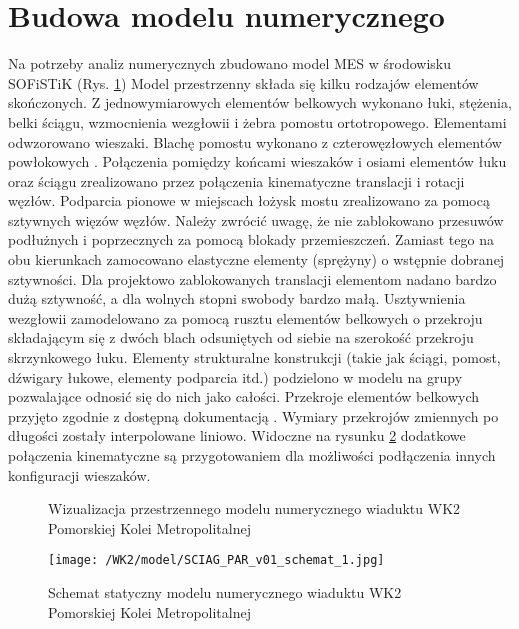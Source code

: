 \section{Budowa modelu numerycznego} \label{sect:wk2_basic_num_model}

Na potrzeby analiz numerycznych zbudowano model MES w środowisku SOFiSTiK (Rys. \ref{fig: model_wk2_visualization}) Model przestrzenny składa się kilku rodzajów elementów skończonych. Z jednowymiarowych elementów belkowych wykonano łuki, stężenia, belki ściągu, wzmocnienia wezgłowii i żebra pomostu ortotropowego. Elementami  odwzorowano wieszaki. Blachę pomostu wykonano z czterowęzłowych elementów powłokowych \parencite{SOFiSTiK2018}. Połączenia pomiędzy końcami wieszaków i osiami elementów łuku oraz ściągu zrealizowano przez połączenia kinematyczne translacji i rotacji węzłów. Podparcia pionowe w miejscach łożysk mostu zrealizowano za pomocą sztywnych więzów węzłów. Należy zwrócić uwagę, że nie zablokowano przesuwów podłużnych i poprzecznych za pomocą blokady przemieszczeń. Zamiast tego na obu kierunkach zamocowano elastyczne elementy (sprężyny) o wstępnie dobranej sztywności. Dla projektowo zablokowanych translacji elementom nadano bardzo dużą sztywność, a dla wolnych stopni swobody bardzo małą. Usztywnienia wezgłowii zamodelowano za pomocą rusztu elementów belkowych o przekroju składającym się z dwóch blach odsuniętych od siebie na szerokość przekroju skrzynkowego łuku. Elementy strukturalne konstrukcji (takie jak ściągi, pomost, dźwigary łukowe, elementy podparcia itd.) podzielono w modelu na grupy pozwalające odnosić się do nich jako całości. Przekroje elementów belkowych przyjęto zgodnie z dostępną dokumentacją \parencite{SOFiSTiK2018}. Wymiary przekrojów zmiennych po długości zostały interpolowane liniowo. Widoczne na rysunku \ref{fig: model_wk2_static_scheme} dodatkowe połączenia kinematyczne są przygotowaniem dla możliwości podłączenia innych konfiguracji wieszaków.



\begin{figure}[hbt!]
	\centering
	\captionsetup{justification=centering}
	\caption{Wizualizacja przestrzennego modelu numerycznego wiaduktu WK2 Pomorskiej Kolei Metropolitalnej}
	\label{fig: model_wk2_visualization}
	
\end{figure}
\begin{figure}[hbt!]
	\centering
	\texttt{[image: /WK2/model/SCIAG\_PAR\_v01\_schemat\_1.jpg]}
	\captionsetup{justification=centering}
	\caption{Schemat statyczny modelu numerycznego wiaduktu WK2 Pomorskiej Kolei Metropolitalnej}
	\label{fig: model_wk2_static_scheme}
\end{figure}

